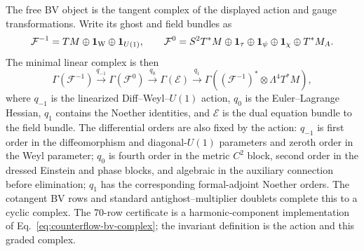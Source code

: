 \documentclass[11pt]{article}
\begin{document}
The free BV object is the tangent complex of the displayed action and gauge
transformations.  Write its ghost and field bundles as
\begin{equation}
 \mathcal F^{-1}=TM\oplus\mathbf1_{\rm W}\oplus\mathbf1_{U(1)},
 \qquad
 \mathcal F^0=S^2T^*M\oplus\mathbf1_\tau\oplus\mathbf1_\psi
              \oplus\mathbf1_\chi\oplus T^*M_A.
\end{equation}
The minimal linear complex is then
\begin{equation}
 \Gamma(\mathcal F^{-1})\xrightarrow{q_{-1}}
 \Gamma(\mathcal F^0)\xrightarrow{q_0}
 \Gamma(\mathcal E)\xrightarrow{q_1}
 \Gamma((\mathcal F^{-1})^*\otimes\Lambda^4T^*M),
 \label{eq:counterflow-bv-complex}
\end{equation}
where $q_{-1}$ is the linearized Diff--Weyl--$U(1)$ action, $q_0$ is the
Euler--Lagrange Hessian, $q_1$ contains the Noether identities, and
$\mathcal E$ is the dual equation bundle to the field bundle.  The
differential orders are also fixed by the action: $q_{-1}$ is first order in the
diffeomorphism and diagonal-$U(1)$ parameters and zeroth order in the Weyl
parameter; $q_0$ is fourth order in the metric $C^2$ block, second order in
the dressed Einstein and phase blocks, and algebraic in the auxiliary
connection before elimination; $q_1$ has the corresponding formal-adjoint
Noether orders.  The cotangent
BV rows and standard antighost--multiplier doublets complete this to a cyclic
complex.  The 70-row certificate is a harmonic-component implementation of
Eq.~\eqref{eq:counterflow-bv-complex}; the invariant definition is the action
and this graded complex.
\end{document}
